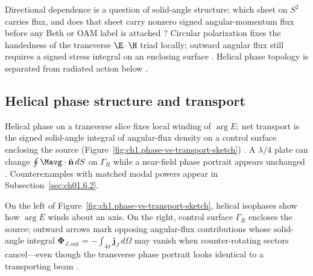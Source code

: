 Directional dependence is a question of solid-angle structure: which sheet on $S^{2}$ carries flux, and does that sheet carry nonzero signed angular-momentum flux before any Beth or OAM label is attached \cite{belinfante1940}? Circular polarization fixes the handedness of the transverse \(\E\)--\(\H\) triad locally; outward angular flux still requires a signed stress integral on an enclosing surface \cite{stratton1941,beth1936}. Helical phase topology is separated from radiated action below \cite{allen1992}.

\subsection{Helical phase structure and transport}
\label{sec:ch01.2.2}

Helical phase on a transverse slice fixes local winding of $\arg E$; net transport is the signed solid-angle integral of angular-flux density on a control surface enclosing the source (Figure~\ref{fig:ch1.phase-vs-transport-sketch}) \cite{belinfante1940,allen1992}. A $\lambda/4$ plate can change $\oint \Mavg\cdot\hat{\mathbf{n}}\,dS$ on $\Gamma_R$ while a near-field phase portrait appears unchanged \cite{allen1992,beth1936}. Counterexamples with matched modal powers appear in Subsection~\ref{sec:ch01.6.2}.

On the left of Figure~\ref{fig:ch1.phase-vs-transport-sketch}, helical isophases show how $\arg E$ winds about an axis. On the right, control surface $\Gamma_R$ encloses the source; outward arrows mark opposing angular-flux contributions whose solid-angle integral $\boldsymbol{\Phi}_{J,\mathrm{out}}=-\int_{4\pi}\mathbf{j}_J\,d\Omega$ may vanish when counter-rotating sectors cancel---even though the transverse phase portrait looks identical to a transporting beam \cite{allen1992,beth1936}.

